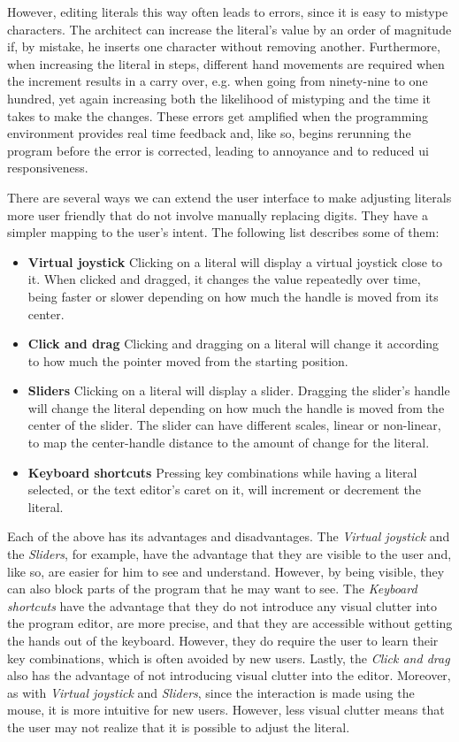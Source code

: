 However, editing literals this way often leads to errors, since it is easy to mistype characters.
The architect can increase the literal's value by an order of magnitude if, by mistake, he inserts one character without removing another.
Furthermore, when increasing the literal in steps, different hand movements are required when the increment results in a carry over, e.g. when going from ninety-nine to one hundred, yet again increasing both the likelihood of mistyping and the time it takes to make the changes.
These errors get amplified when the programming environment provides real time feedback and, like so, begins rerunning the program before the error is corrected, leading to annoyance and to reduced \gls{ui} responsiveness.

There are several ways we can extend the user interface to make adjusting literals more user friendly that do not involve manually replacing digits.
They have a simpler mapping to the user's intent.
The following list describes some of them:

\begin{itemize}
  \item {\bf Virtual joystick} Clicking on a literal will display a virtual joystick close to it. When clicked and dragged, it changes the value repeatedly over time, being faster or slower depending on how much the handle is moved from its center.
  \item {\bf Click and drag} Clicking and dragging on a literal will change it according to how much the pointer moved from the starting position.
  \item {\bf Sliders} Clicking on a literal will display a slider. Dragging the slider's handle will change the literal depending on how much the handle is moved from the center of the slider. The slider can have different scales, linear or non-linear, to map the center-handle distance to the amount of change for the literal.
  \item {\bf Keyboard shortcuts} Pressing key combinations while having a literal selected, or the text editor's caret on it, will increment or decrement the literal.
\end{itemize}

Each of the above has its advantages and disadvantages.
The {\it Virtual joystick} and the {\it Sliders}, for example, have the advantage that they are visible to the user and, like so, are easier for him to see and understand.
However, by being visible, they can also block parts of the program that he may want to see.
The {\it Keyboard shortcuts} have the advantage that they do not introduce any visual clutter into the program editor, are more precise, and that they are accessible without getting the hands out of the keyboard.
However, they do require the user to learn their key combinations, which is often avoided by new users.
Lastly, the {\it Click and drag} also has the advantage of not introducing visual clutter into the editor.
Moreover, as with {\it Virtual joystick} and {\it Sliders}, since the interaction is made using the mouse, it is more intuitive for new users.
However, less visual clutter means that the user may not realize that it is possible to adjust the literal.

